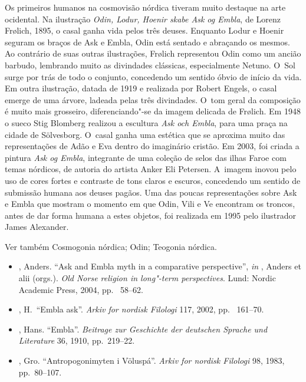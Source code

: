 Os primeiros humanos na cosmovisão nórdica tiveram muito destaque na
arte ocidental. Na ilustração \emph{Odin, Lodur, Hoenir skabe Ask og
Embla}, de Lorenz Frølich, 1895, o casal ganha vida pelos três deuses.
Enquanto Lodur e Hoenir seguram os braços de Ask e Embla, Odin está
sentado e abraçando os mesmos. Ao contrário de suas outras ilustrações,
Frølich representou Odin como um ancião barbudo, lembrando muito as
divindades clássicas, especialmente Netuno. O~Sol surge por trás de todo
o conjunto, concedendo um sentido óbvio de início da vida. Em outra
ilustração, datada de 1919 e realizada por Robert Engels, o casal emerge
de uma árvore, ladeada pelas três divindades. O~tom geral da composição
é muito mais grosseiro, diferenciando"-se da imagem delicada de Frølich.
Em 1948 o sueco Stig Blomberg realizou a escultura \emph{Ask och Embla},
para uma praça na cidade de Sölvesborg. O~casal ganha uma estética que
se aproxima muito das representações de Adão e Eva dentro do imaginário
cristão. Em 2003, foi criada a pintura \emph{Ask og Embla}, integrante
de uma coleção de selos das ilhas Faroe com temas nórdicos, de autoria
do artista Anker Eli Petersen. A~imagem inovou pelo uso de cores fortes
e contraste de tons claros e escuros, concedendo um sentido de submissão
humana aos deuses pagãos. Uma das poucas representações sobre Ask e
Embla que mostram o momento em que Odin, Vili e Ve encontram os troncos,
antes de dar forma humana a estes objetos, foi realizada em 1995 pelo
ilustrador James Alexander.

Ver também Cosmogonia nórdica; Odin; Teogonia nórdica.



\begin{itemize}\footnotesize
\item
  , Anders. ``Ask and Embla myth in a comparative perspective'', \emph{in} 
  , Anders et alii (orgs.). \emph{Old Norse religion in
  long"-term perspectives}. Lund: Nordic Academic Press, 2004, pp.~ 58--62.
\item
  , H.~``Embla ask''. \emph{Arkiv for nordisk Filologi} 117, 2002, pp.~ 161--70.
\item
  , Hans. ``Embla''. \emph{Beitrage zur Geschichte der deutschen
  Sprache und Literature} 36, 1910, pp.~219--22.
\item
  , Gro. ``Antropogonimyten i Völuspá''. \emph{Arkiv for nordisk
  Filologi} 98, 1983, pp.~80--107.
\end{itemize}

